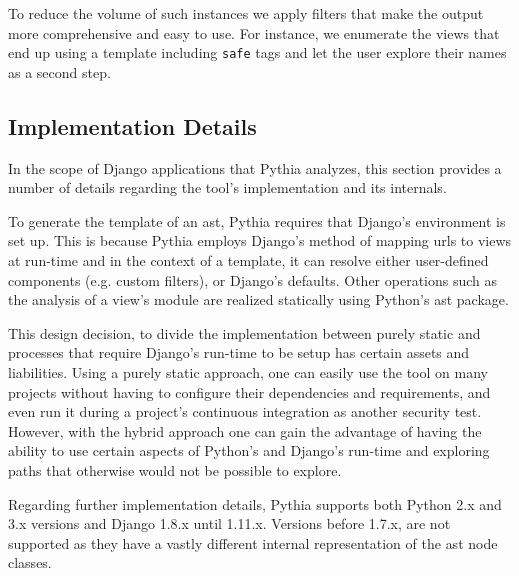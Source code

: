 To reduce the volume of such instances
we apply filters that make the output
more comprehensive and easy to use.
For instance,
we enumerate the views that end up
using a template including {\tt safe} tags
and let the user explore their names as a
second step.

\subsection{Implementation Details}
\label{sec:implementation}

In the scope of Django applications that 
Pythia analyzes, this section provides 
a number of details regarding
the tool's implementation and its internals.

To generate the template of an {\sc ast},
Pythia requires that Django's environment is set up.
This is because Pythia employs Django's method
of mapping {\sc url}s to views at run-time
and in the context of a template,
it can resolve either user-defined components
(e.g. custom filters), or Django's defaults.
Other operations such as the analysis of a view's
module are realized statically using Python's
{\sc ast} package.

This design decision, to divide the implementation
between purely static and processes that require
Django's run-time to be setup has certain
assets and liabilities.
Using a purely static approach,
one can easily use the tool on many projects
without having to configure their dependencies
and requirements,
and even run it during a project's continuous
integration as another security test.
However,
with the hybrid approach one can gain the
advantage of having the ability to use
certain aspects of Python's and Django's
run-time and exploring paths that
otherwise would not be possible to explore. 

Regarding further implementation details, 
Pythia supports both Python 2.x and 3.x
versions and Django 1.8.x until 1.11.x. Versions 
before 1.7.x, are not supported as they have a
vastly different internal representation
of the {\sc ast} node classes.